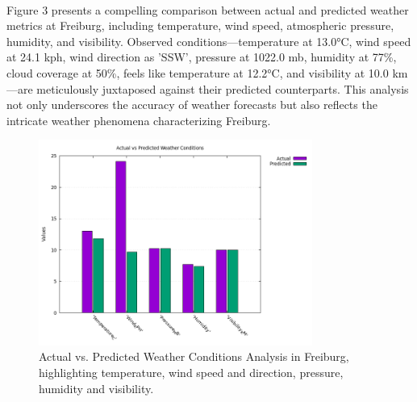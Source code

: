 \documentclass[11pt]{article}
\begin{document}
\paragraph{}Figure 3 presents a compelling comparison between actual and predicted weather metrics at Freiburg, including temperature, wind speed, atmospheric pressure, humidity, and visibility. Observed conditions—temperature at 13.0°C, wind speed at 24.1 kph, wind direction as 'SSW', pressure at 1022.0 mb, humidity at 77\%, cloud coverage at 50\%, feels like temperature at 12.2°C, and visibility at 10.0 km—are meticulously juxtaposed against their predicted counterparts. This analysis not only underscores the accuracy of weather forecasts but also reflects the intricate weather phenomena characterizing Freiburg.
\begin{figure}[h]
\centering
\includegraphics[width=0.8\textwidth]{data/graph/weather_comparison_graph.png}
\caption{Actual vs. Predicted Weather Conditions Analysis in Freiburg, highlighting temperature, wind speed and direction, pressure, humidity and visibility.}
\end{figure}
\end{document}
